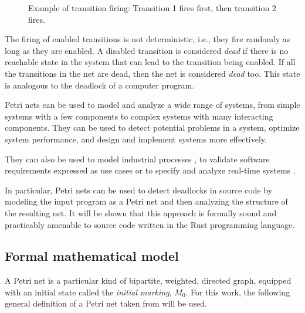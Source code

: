 \begin{figure}[!htb]
      \centering
      
      \caption{Example of transition firing: Transition 1 fires first, then transition 2 fires.}
      \label{fig:petri-net-transition-example}
\end{figure}

The firing of enabled transitions is not deterministic,
i.e., they fire randomly as long as they are enabled.
A disabled transition is considered \emph{dead}
if there is no reachable state in the system that can lead to the transition being enabled.
If all the transitions in the net are dead, then the net is considered \emph{dead} too.
This state is analogous to the deadlock of a computer program.

Petri nets can be used to model and analyze a wide range of systems,
from simple systems with a few components to complex systems with many interacting components.
They can be used to detect potential problems in a system,
optimize system performance, and design and implement systems more effectively.

They can also be used to model industrial processes \cite{aalst1994putting},
to validate software requirements expressed as use cases \cite{silva2004applying}
or to specify and analyze real-time systems \cite{kavi1996specification}.

In particular, Petri nets can be used to detect deadlocks in source code
by modeling the input program as a Petri net and then analyzing the structure of the resulting net.
It will be shown that this approach is formally sound and
practicably amenable to source code written in the Rust programming language.

\subsection{Formal mathematical model}

A Petri net is a particular kind of bipartite, weighted, directed graph,
equipped with an initial state called the \emph{initial marking}, $M_{0}$.
For this work, the following general definition of a Petri net
taken from \cite{murata1989} will be used.

